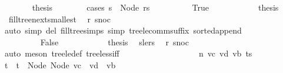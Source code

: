 \begin{isabellebody}
\ \ \ \ \ \ \isamarkupfalse%
\ {\isacharquery}{\kern0pt}thesis\isanewline
\ \ \ \ \ \ \isamarkupfalse%
\ {\isacharparenleft}{\kern0pt}cases\ {\isachardoublequoteopen}s{\isacharprime}{\kern0pt}\ {\isacharequal}{\kern0pt}\ Node\ rs{\isachardoublequoteclose}{\isacharparenright}{\kern0pt}\isanewline
\ \ \ \ \ \ \ \ \isamarkupfalse%
\ True\isanewline
\ \ \ \ \ \ \ \ \isamarkupfalse%
\ \isamarkupfalse%
\ {\isacharquery}{\kern0pt}thesis\ \isamarkupfalse%
\ {}{\isacharparenleft}{\kern0pt}{}{\isacharcomma}{\kern0pt}{}{\isacharparenright}{\kern0pt}\ fill{\isacharunderscore}{\kern0pt}tree{\isacharunderscore}{\kern0pt}next{\isacharunderscore}{\kern0pt}smallest\ \isamarkupfalse%
\ r\ snoc\isanewline
\ \ \ \ \ \ \ \ \ \ \isamarkupfalse%
\ {\isacharparenleft}{\kern0pt}auto\ simp\ del{\isacharcolon}{\kern0pt}\ fill{\isacharunderscore}{\kern0pt}tree{\isachardot}{\kern0pt}simps\ simp{\isacharcolon}{\kern0pt}\ tree{\isacharunderscore}{\kern0pt}le{\isacharunderscore}{\kern0pt}comm{\isacharunderscore}{\kern0pt}suffix\ sorted{\isacharunderscore}{\kern0pt}append{\isacharparenright}{\kern0pt}\isanewline
\ \ \ \ \ \ \isamarkupfalse%
\isanewline
\ \ \ \ \ \ \ \ \isamarkupfalse%
\ False\isanewline
\ \ \ \ \ \ \ \ \isamarkupfalse%
\ \isamarkupfalse%
\ {\isacharquery}{\kern0pt}thesis\ \isamarkupfalse%
\ s{\isacharprime}{\kern0pt}{\isacharunderscore}{\kern0pt}le{\isacharunderscore}{\kern0pt}rs\ \isamarkupfalse%
\ r\ snoc\ \isamarkupfalse%
\ {\isacharparenleft}{\kern0pt}auto{\isacharcomma}{\kern0pt}\ meson\ tree{\isacharunderscore}{\kern0pt}le{\isacharunderscore}{\kern0pt}def\ tree{\isacharunderscore}{\kern0pt}less{\isacharunderscore}{\kern0pt}iff{\isacharparenright}{\kern0pt}\isanewline
\ \ \ \ \ \ \isamarkupfalse%
\isanewline
\ \ \ \ \isamarkupfalse%
\isanewline
\ \ \isamarkupfalse%
\isanewline
{}\isamarkupfalse%
\isanewline
\ \ \isamarkupfalse%
\ {\isacharparenleft}{\kern0pt}{}\ n\ vc\ vd\ vb\ ts{\isacharparenright}{\kern0pt}\isanewline
\ \ \isamarkupfalse%
\ t\ \ {\isachardoublequoteopen}t\ {\isacharequal}{\kern0pt}\ Node\ {\isacharparenleft}{\kern0pt}Node\ {\isacharparenleft}{\kern0pt}vc\ {\isacharhash}{\kern0pt}\ vd{\isacharparenright}{\kern0pt}\ {\isacharhash}{\kern0pt}\ vb{\isacharparenright}{\kern0pt}{\isachardoublequoteclose}\isanewline

\end{isabellebody}

